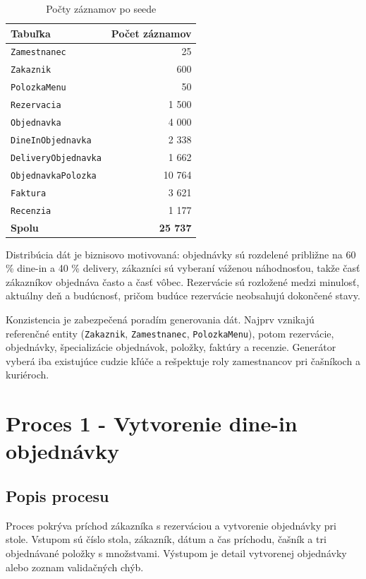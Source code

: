 \documentclass[11pt, a4paper]{article}
\begin{document}
\begin{table}[H]
\centering
\small
\begin{tabular}{lr}
\toprule
\textbf{Tabuľka} & \textbf{Počet záznamov} \\
\midrule
\texttt{Zamestnanec} & 25 \\
\texttt{Zakaznik} & 600 \\
\texttt{PolozkaMenu} & 50 \\
\texttt{Rezervacia} & 1 500 \\
\texttt{Objednavka} & 4 000 \\
\texttt{DineInObjednavka} & 2 338 \\
\texttt{DeliveryObjednavka} & 1 662 \\
\texttt{ObjednavkaPolozka} & 10 764 \\
\texttt{Faktura} & 3 621 \\
\texttt{Recenzia} & 1 177 \\
\midrule
\textbf{Spolu} & \textbf{25 737} \\
\bottomrule
\end{tabular}
\caption{Počty záznamov po seede}
\end{table}

Distribúcia dát je biznisovo motivovaná: objednávky sú rozdelené približne na 60 \% dine-in a
40 \% delivery, zákazníci sú vyberaní váženou náhodnosťou, takže časť zákazníkov objednáva často a
časť vôbec. Rezervácie sú rozložené medzi minulosť, aktuálny deň a budúcnosť, pričom budúce
rezervácie neobsahujú dokončené stavy.

Konzistencia je zabezpečená poradím generovania dát. Najprv vznikajú referenčné entity
(\texttt{Zakaznik}, \texttt{Zamestnanec}, \texttt{PolozkaMenu}), potom rezervácie, objednávky,
špecializácie objednávok, položky, faktúry a recenzie. Generátor vyberá iba existujúce cudzie kľúče
a rešpektuje roly zamestnancov pri čašníkoch a kuriéroch.

\section{Proces 1 - Vytvorenie dine-in objednávky}

\subsection*{Popis procesu}

Proces pokrýva príchod zákazníka s rezerváciou a vytvorenie objednávky pri stole. Vstupom sú
číslo stola, zákazník, dátum a čas príchodu, čašník a tri objednávané položky s množstvami.
Výstupom je detail vytvorenej objednávky alebo zoznam validačných chýb.
\end{document}

